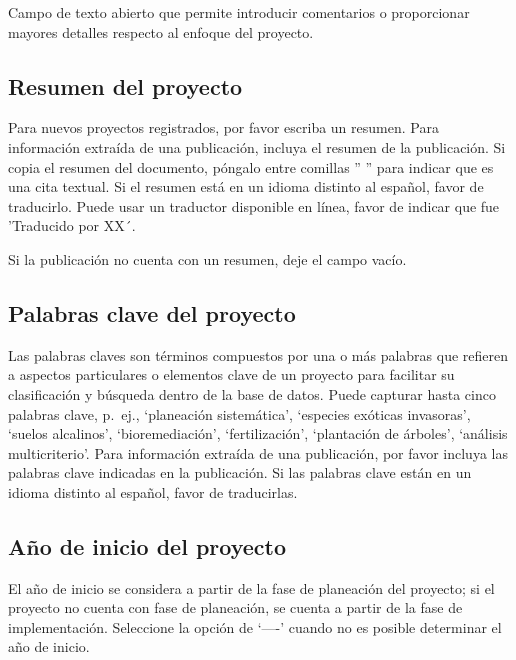 \documentclass[
]{book}
\begin{document}
Campo de texto abierto que permite introducir comentarios o proporcionar mayores detalles respecto al enfoque del proyecto.

\hypertarget{resumen-del-proyecto}{%
\subsection{Resumen del proyecto}\label{resumen-del-proyecto}}

Para nuevos proyectos registrados, por favor escriba un resumen.
Para información extraída de una publicación, incluya el resumen de la publicación.
Si copia el resumen del documento, póngalo entre comillas '' '' para indicar que es una cita textual.
Si el resumen está en un idioma distinto al español, favor de traducirlo.
Puede usar un traductor disponible en línea, favor de indicar que fue 'Traducido por XX´.

Si la publicación no cuenta con un resumen, deje el campo vacío.

\hypertarget{palabras-clave-del-proyecto}{%
\subsection{Palabras clave del proyecto}\label{palabras-clave-del-proyecto}}

Las palabras claves son términos compuestos por una o más palabras que refieren a aspectos particulares o elementos clave de un proyecto para facilitar su clasificación y búsqueda dentro de la base de datos.
Puede capturar hasta cinco palabras clave, p.~ej., `planeación sistemática', `especies exóticas invasoras', `suelos alcalinos', `bioremediación', `fertilización', `plantación de árboles', `análisis multicriterio'.
Para información extraída de una publicación, por favor incluya las palabras clave indicadas en la publicación.
Si las palabras clave están en un idioma distinto al español, favor de traducirlas.

\hypertarget{auxf1o-de-inicio-del-proyecto}{%
\subsection{Año de inicio del proyecto}\label{auxf1o-de-inicio-del-proyecto}}

El año de inicio se considera a partir de la fase de planeación del proyecto; si el proyecto no cuenta con fase de planeación, se cuenta a partir de la fase de implementación.
Seleccione la opción de `----' cuando no es posible determinar el año de inicio.
\end{document}
